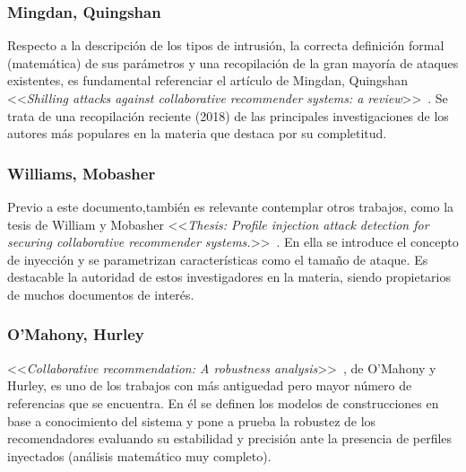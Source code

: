 \subsubsection{Mingdan, Quingshan~\cite{mingdan2018ShillingAttacksAReview}}
Respecto a la descripción de los tipos de intrusión, la correcta definición formal (matemática) de sus parámetros y una recopilación de la gran mayoría de ataques existentes, es fundamental referenciar el artículo de Mingdan, Quingshan <<\textit{Shilling attacks against collaborative recommender systems: a review}>>~\cite{mingdan2018ShillingAttacksAReview}. Se trata de una recopilación reciente (2018) de las principales investigaciones de los autores más populares en la materia que destaca por su completitud.

\subsubsection{Williams, Mobasher~\cite{Mobasher2006Thesis}}
Previo a este documento,también es relevante contemplar otros trabajos, como la tesis de William y Mobasher <<\textit{Thesis: Profile injection attack detection for securing collaborative recommender systems.}>>~\cite{Mobasher2006Thesis}. En ella se introduce el concepto de inyección y se parametrizan características como el tamaño de ataque. Es destacable la autoridad de estos investigadores en la materia, siendo propietarios de muchos documentos de interés.

\subsubsection{O'Mahony, Hurley~\citep{mahony2004CollaborativeRecommendation}}
<<\textit{Collaborative recommendation: A robustness analysis}>>~\cite{mahony2004CollaborativeRecommendation}, de O'Mahony y Hurley, es uno de los trabajos con más antiguedad pero mayor número de referencias que se encuentra. En él se definen los modelos de construcciones en base a conocimiento del sistema y pone a prueba la robustez de los recomendadores evaluando su estabilidad y precisión ante la presencia de perfiles inyectados (análisis matemático muy completo).